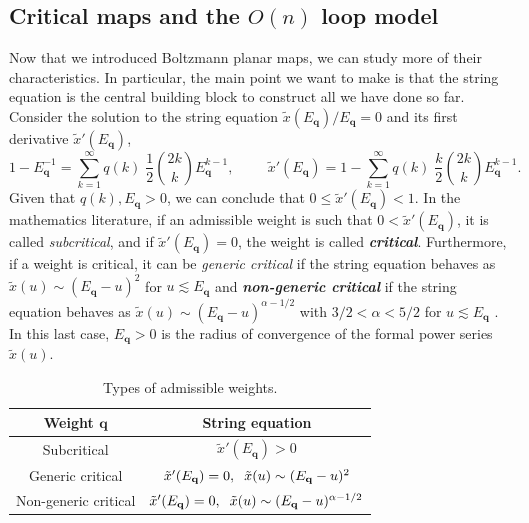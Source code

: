 \documentclass[a4paper,11pt]{article}
\begin{document}
\subsection{Critical maps and the $O(n)$ loop model}
Now that we introduced Boltzmann planar maps, we can study more of their characteristics. In particular, the main point we want to make is that the string equation is the central building block to construct all we have done so far. Consider the solution to the string equation $\tilde{x}(E_\mathbf{q})/E_\mathbf{q}=0$ and its first derivative $\tilde{x}'(E_\mathbf{q})$,
\begin{equation}
    1-E_\mathbf{q}^{-1}=\sum_{k=1}^\infty q(k)\;\frac{1}{2}\binom{2k}{k} E_\mathbf{q}^{k-1}, \hspace{1cm} \tilde{x}'(E_\mathbf{q})=1-\sum_{k=1}^\infty q(k)\;\frac{k}{2}\binom{2k}{k} E_\mathbf{q}^{k-1}.
\end{equation}
Given that $q(k),E_\mathbf{q}>0$, we can conclude that $0\leq \tilde{x}'(E_\mathbf{q})<1$.
In the mathematics literature, if an admissible weight is such that $0<\tilde{x}'(E_\mathbf{q})$, it is called \textit{subcritical}, and if $\tilde{x}'(E_\mathbf{q})=0$, the weight is called \textbf{\textit{critical}}. Furthermore, if a weight is critical, it can be \textit{generic critical} if the string equation behaves as $\tilde{x}(u) \sim (E_\mathbf{q}-u)^2$ for $u\lesssim E_\mathbf{q}$ and \textbf{\textit{non-generic critical}} if the string equation behaves as $\tilde{x}(u)\sim (E_\mathbf{q}-u)^{\alpha-1/2}$ with $3/2<\alpha<5/2$ for $u\lesssim E_\mathbf{q}$ \cite{10.2307/25450028}. In this last case, $E_\mathbf{q}>0$ is the radius of convergence of the formal power series $\tilde{x}(u)$.
\begin{table}[h]
    \centering
    \begin{tabular}{|c|c|}
    \hline
        Weight $\mathbf{q}$ & String equation \\
    \hline     
         Subcritical & $\tilde{x}'(E_\mathbf{q})> 0$ 
         \\
         Generic critical & $\tilde{x}'(E_\mathbf{q})=0, \hspace{2mm} \tilde{x}(u) \sim (E_\mathbf{q}-u)^2$
         \\
         Non-generic critical & $\tilde{x}'(E_\mathbf{q})=0, \hspace{2mm} \tilde{x}(u)\sim (E_\mathbf{q}-u)^{\alpha-1/2}$\\
         \hline
    \end{tabular}
    \caption{Types of admissible weights.}
    \label{tab:critical}
\end{table}\\
\end{document}
